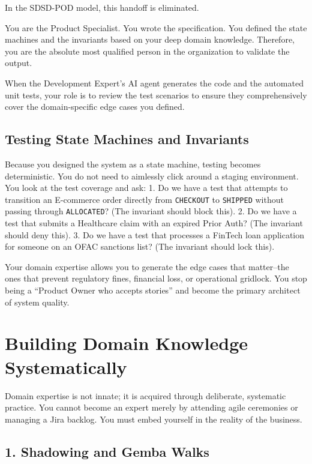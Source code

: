 \documentclass[
  11pt,
  openany,
  oneside]{book}
\begin{document}
In the SDSD-POD model, this handoff is eliminated.

You are the Product Specialist. You wrote the specification. You defined
the state machines and the invariants based on your deep domain
knowledge. Therefore, you are the absolute most qualified person in the
organization to validate the output.

When the Development Expert's AI agent generates the code and the
automated unit tests, your role is to review the test scenarios to
ensure they comprehensively cover the domain-specific edge cases you
defined.

\subsection{Testing State Machines and
Invariants}\label{testing-state-machines-and-invariants}

Because you designed the system as a state machine, testing becomes
deterministic. You do not need to aimlessly click around a staging
environment. You look at the test coverage and ask: 1. Do we have a test
that attempts to transition an E-commerce order directly from
\texttt{CHECKOUT} to \texttt{SHIPPED} without passing through
\texttt{ALLOCATED}? (The invariant should block this). 2. Do we have a
test that submits a Healthcare claim with an expired Prior Auth? (The
invariant should deny this). 3. Do we have a test that processes a
FinTech loan application for someone on an OFAC sanctions list? (The
invariant should lock this).

Your domain expertise allows you to generate the edge cases that
matter--the ones that prevent regulatory fines, financial loss, or
operational gridlock. You stop being a ``Product Owner who accepts
stories'' and become the primary architect of system quality.

\bigskip

\section{Building Domain Knowledge
Systematically}\label{building-domain-knowledge-systematically}

Domain expertise is not innate; it is acquired through deliberate,
systematic practice. You cannot become an expert merely by attending
agile ceremonies or managing a Jira backlog. You must embed yourself in
the reality of the business.

\subsection{1. Shadowing and Gemba
Walks}\label{shadowing-and-gemba-walks}
\end{document}
